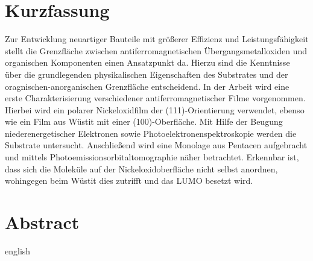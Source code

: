 \thispagestyle{plain}

\section*{Kurzfassung}
Zur Entwicklung neuartiger Bauteile mit größerer Effizienz und Leistungsfähigkeit stellt die Grenzfläche zwischen antiferromagnetischen Übergangsmetalloxiden und organischen Komponenten einen Ansatzpunkt da.
Hierzu sind die Kenntnisse über die grundlegenden physikalischen Eigenschaften des Substrates und der oragnischen-anorganischen Grenzfläche entscheidend.
In der Arbeit wird eine erste Charakterisierung verschiedener antiferromagnetischer Filme vorgenommen.
Hierbei wird ein polarer Nickeloxidfilm der (111)-Orientierung verwendet, ebenso wie ein Film aus Wüstit mit einer (100)-Oberfläche.
Mit Hilfe der Beugung niederenergetischer Elektronen sowie Photoelektronenspektroskopie werden die Substrate untersucht.
Anschließend wird eine Monolage aus Pentacen aufgebracht und mittels Photoemissionsorbitaltomographie näher betrachtet.
Erkennbar ist, dass sich die Moleküle auf der Nickeloxidoberfläche nicht selbst anordnen, wohingegen beim Wüstit dies zutrifft und das LUMO besetzt wird.

\section*{Abstract}
\begin{foreignlanguage}{english}

\end{foreignlanguage}
